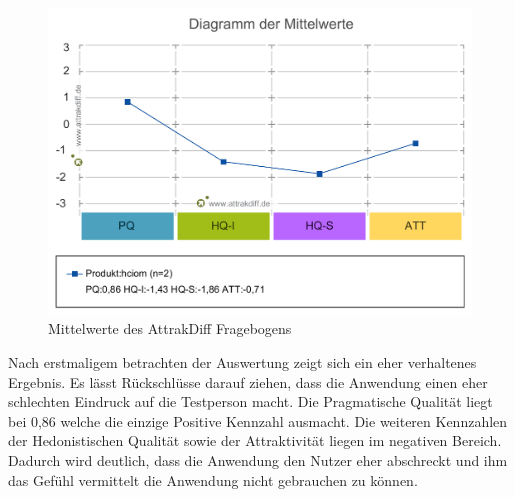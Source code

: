 \documentclass[runningheads,a4paper, 12pt]{llncs}
\begin{document}
\begin{figure}[H]
	\centering
	\includegraphics[angle=0,scale=0.5]{attrakdiff_result2}
	\caption{Mittelwerte des AttrakDiff Fragebogens}
	\label{fig:result5}
\end{figure}

Nach erstmaligem betrachten der Auswertung zeigt sich ein eher verhaltenes Ergebnis. Es lässt Rückschlüsse darauf ziehen, dass die Anwendung einen eher schlechten Eindruck auf die Testperson macht. Die Pragmatische Qualität liegt bei 0,86 welche die einzige Positive Kennzahl ausmacht. Die weiteren Kennzahlen der Hedonistischen Qualität sowie der Attraktivität liegen im negativen Bereich. Dadurch wird deutlich, dass die Anwendung den Nutzer eher abschreckt und ihm das Gefühl vermittelt die Anwendung nicht gebrauchen zu können.
\end{document}

